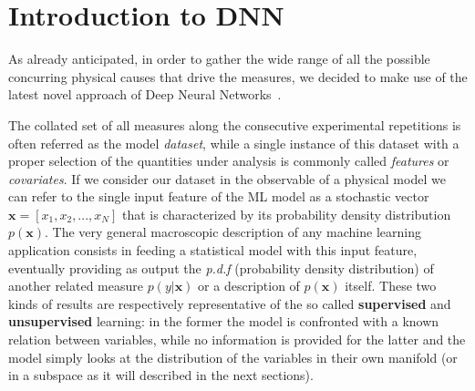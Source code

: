 \section{Introduction to DNN}

As already anticipated, in order to gather the wide range of all the possible concurring physical causes that drive the measures, we decided to make use of the latest novel approach of Deep Neural Networks~\cite{Goodfellow-et-al-2016}. %

The collated set of all measures along the consecutive experimental repetitions is often referred as the model \textit{dataset}, while a single instance of this dataset with a proper selection of the quantities under analysis is commonly called \textit{features} or \textit{covariates}. %
%
If we consider our dataset in the observable of a physical model we can refer to the single input feature of the ML model as a stochastic vector $\bm{x} = [x_1,x_2, ... ,x_N]$ that is characterized by its probability density distribution $p(\bm{x})$. The very general macroscopic description of any machine learning application consists in feeding a statistical model with this input feature, eventually providing as output the \textit{p.d.f} (probability density distribution) of another related measure $p(y|\bm{x})$ or a description of $p(\bm{x})$ itself. These two kinds of results are respectively representative of the so called  \textbf{supervised} and \textbf{unsupervised} learning: in the former the model is confronted with a known relation between variables, while no information is provided for the latter and the model simply looks at the distribution of the variables in their own manifold (or in a subspace as it will described in the next sections).

